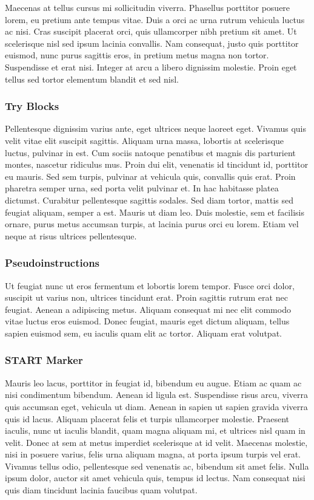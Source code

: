 \documentclass[12pt,twoside,notitlepage]{report}
\begin{document}
Maecenas at tellus cursus mi sollicitudin viverra. Phasellus porttitor posuere lorem, eu pretium ante tempus vitae. Duis a orci ac urna rutrum vehicula luctus ac nisi. Cras suscipit placerat orci, quis ullamcorper nibh pretium sit amet. Ut scelerisque nisl sed ipsum lacinia convallis. Nam consequat, justo quis porttitor euismod, nunc purus sagittis eros, in pretium metus magna non tortor. Suspendisse et erat nisi. Integer at arcu a libero dignissim molestie. Proin eget tellus sed tortor elementum blandit et sed nisl.

\subsubsection{Try Blocks}

Pellentesque dignissim varius ante, eget ultrices neque laoreet eget. Vivamus quis velit vitae elit suscipit sagittis. Aliquam urna massa, lobortis at scelerisque luctus, pulvinar in est. Cum sociis natoque penatibus et magnis dis parturient montes, nascetur ridiculus mus. Proin dui elit, venenatis id tincidunt id, porttitor eu mauris. Sed sem turpis, pulvinar at vehicula quis, convallis quis erat. Proin pharetra semper urna, sed porta velit pulvinar et. In hac habitasse platea dictumst. Curabitur pellentesque sagittis sodales. Sed diam tortor, mattis sed feugiat aliquam, semper a est. Mauris ut diam leo. Duis molestie, sem et facilisis ornare, purus metus accumsan turpis, at lacinia purus orci eu lorem. Etiam vel neque at risus ultrices pellentesque.

\subsubsection{Pseudoinstructions}
\label{section:Code_Pseudoinstructions}

Ut feugiat nunc ut eros fermentum et lobortis lorem tempor. Fusce orci dolor, suscipit ut varius non, ultrices tincidunt erat. Proin sagittis rutrum erat nec feugiat. Aenean a adipiscing metus. Aliquam consequat mi nec elit commodo vitae luctus eros euismod. Donec feugiat, mauris eget dictum aliquam, tellus sapien euismod sem, eu iaculis quam elit ac tortor. Aliquam erat volutpat.

\subsubsection{START Marker}

Mauris leo lacus, porttitor in feugiat id, bibendum eu augue. Etiam ac quam ac nisi condimentum bibendum. Aenean id ligula est. Suspendisse risus arcu, viverra quis accumsan eget, vehicula ut diam. Aenean in sapien ut sapien gravida viverra quis id lacus. Aliquam placerat felis et turpis ullamcorper molestie. Praesent iaculis, nunc ut iaculis blandit, quam magna aliquam mi, et ultrices nisl quam in velit. Donec at sem at metus imperdiet scelerisque at id velit. Maecenas molestie, nisi in posuere varius, felis urna aliquam magna, at porta ipsum turpis vel erat. Vivamus tellus odio, pellentesque sed venenatis ac, bibendum sit amet felis. Nulla ipsum dolor, auctor sit amet vehicula quis, tempus id lectus. Nam consequat nisi quis diam tincidunt lacinia faucibus quam volutpat.
\end{document}
